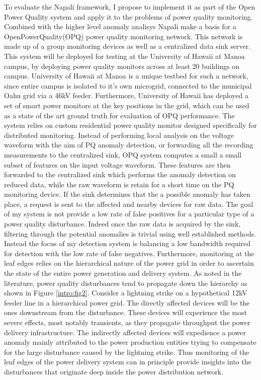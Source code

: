 To evaluate the Napali framework, I propose to implement it as part of the Open Power Quality system and apply it to the problems of power quality monitoring. Combined with the higher level anomaly analisys Napali make a basis for a OpenPowerQuality(OPQ) power quality monitoring network. This network is made up of a group  monitoring devices as well as a centralized data sink server. This system will be deployed for testing at the University of Hawaii at Manoa campus, by deploying power quality monitors across at least 20 buildings on campus. University of Hawaii at Manoa is a unique testbed for such a network, since entire campus is isolated to it's own microgrid, connected to the municipal Oahu grid via a 46kV feeder. Furthermore, University of Hawaii has deployed a set of smart power monitors at the key positions in the grid, which can be used as a state of the art ground truth for evaluation of OPQ performance. The system relies on custom residential power quality monitor designed specifically for distributed monitoring. Instead of performing local analysis on the voltage waveform with the aim of PQ anomaly detection, or forwarding all the recording measurements to the centralized sink, OPQ system computes a small a small subset of features on the input voltage waveform. These features are then forwarded to the centralized sink which performs the anomaly detection on reduced data, while the raw waveform is retain for a short time on the PQ monitoring device. If the sink determines that the a possible anomaly has taken place, a request is sent to the affected and nearby devices for raw data. The goal of my system is not provide a low rate of false positives for a particular type of a power quality disturbance. Indeed once the raw data is acquired by the sink, filtering through the potential anomalies is trivial using well established methods. Instead the focus of my detection system is balancing a low bandwidth required for detection with the low rate of false negatives. Furthermore, monitoring at the leaf edges relies on the hierarchical nature of the power grid in order to ascertain the state of the entire power generation and delivery system. As noted in the literature, power quality disturbances tend to propagate down the hierarchy as shown in Figure \ref{intro:fig2}. Consider a lightning strike on a hypothetical 12kV feeder line in a hierarchical power grid. The directly affected devices will be the ones downstream from the disturbance. These devices will experience the most severe effects, most notably transients, as they propagate throughput the power delivery infrastructure. The indirectly affected devices will expedience a power anomaly mainly attributed to the power production entities trying to compensate for the large disturbance caused by the lightning strike. Thus monitoring of the leaf edges of the power delivery system can in principle provide insights into the disturbances that originate deep inside the power distribution network.

